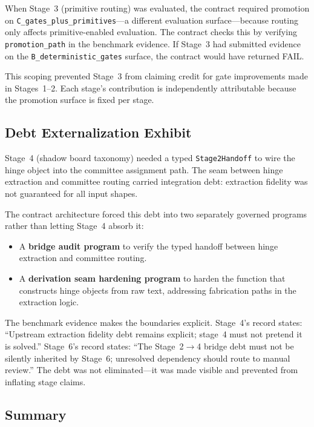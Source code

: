 \documentclass[11pt]{article}
\begin{document}
When Stage~3 (primitive routing) was evaluated, the contract required promotion on \texttt{C\_gates\_plus\_primitives}---a different evaluation surface---because routing only affects primitive-enabled evaluation. The contract checks this by verifying \texttt{promotion\_path} in the benchmark evidence. If Stage~3 had submitted evidence on the \texttt{B\_deterministic\_gates} surface, the contract would have returned FAIL.

This scoping prevented Stage~3 from claiming credit for gate improvements made in Stages~1--2. Each stage's contribution is independently attributable because the promotion surface is fixed per stage.

\subsection{Debt Externalization Exhibit}

Stage~4 (shadow board taxonomy) needed a typed \texttt{Stage2Handoff} to wire the hinge object into the committee assignment path. The seam between hinge extraction and committee routing carried integration debt: extraction fidelity was not guaranteed for all input shapes.

The contract architecture forced this debt into two separately governed programs rather than letting Stage~4 absorb it:

\begin{itemize}[nosep]
\item A \textbf{bridge audit program} to verify the typed handoff between hinge extraction and committee routing.
\item A \textbf{derivation seam hardening program} to harden the function that constructs hinge objects from raw text, addressing fabrication paths in the extraction logic.
\end{itemize}

The benchmark evidence makes the boundaries explicit. Stage~4's record states: ``Upstream extraction fidelity debt remains explicit; stage~4 must not pretend it is solved.'' Stage~6's record states: ``The Stage~2$\to$4 bridge debt must not be silently inherited by Stage~6; unresolved dependency should route to manual review.'' The debt was not eliminated---it was made visible and prevented from inflating stage claims.

\subsection{Summary}
\end{document}

